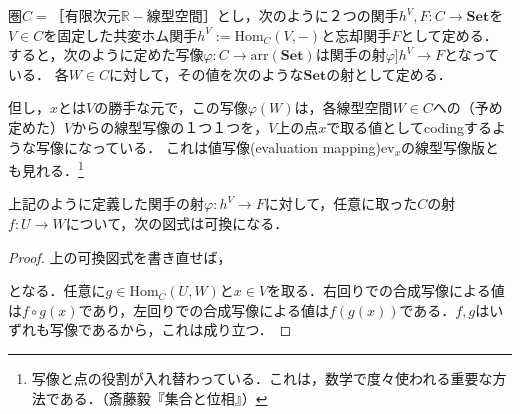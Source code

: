 \documentclass[uplatex, 12pt, dvipdfmx]{jsreport}
\begin{document}
圏$C=［有限次元\mathbb{R}-線型空間］$とし，次のように２つの関手$h^V,F:C\to\mathbf{Set}$を$V\in C$を固定した共変ホム関手$h^V:=\mathrm{Hom}_C(V,-)$と忘却関手$F$として定める．
すると，次のように定めた写像$\varphi :C\to \mathrm{arr}(\mathbf{Set})$は関手の射$\varphi ]h^V\to F$となっている．
各$W\in C$に対して，その値を次のような$\mathbf{Set}$の射として定める．
\begin{center}\end{center}
但し，$x$とは$V$の勝手な元で，この写像$\varphi (W)$は，各線型空間$W\in C$への（予め定めた）$V$からの線型写像の１つ１つを，$V$上の点$x$で取る値としてcodingするような写像になっている．
これは値写像(evaluation mapping)$\mathrm{ev}_x$の線型写像版とも見れる．\footnote{写像と点の役割が入れ替わっている．これは，数学で度々使われる重要な方法である．（斎藤毅『集合と位相』）}

\begin{proposition} \label{prop-welldefinedness1}
    上記のように定義した関手の射$\varphi :h^V\to F$に対して，任意に取った$C$の射$f:U\to W$について，次の図式は可換になる．
    \begin{center}\end{center}
\end{proposition}
\begin{proof}
    上の可換図式を書き直せば，
    \begin{center}\end{center}
    となる．任意に$g\in\mathrm{Hom}_C(U,W)$と$x\in V$を取る．右回りでの合成写像による値は$f\circ g(x)$であり，左回りでの合成写像による値は$f(g(x))$である．$f,g$はいずれも写像であるから，これは成り立つ．
\end{proof}
\end{document}
